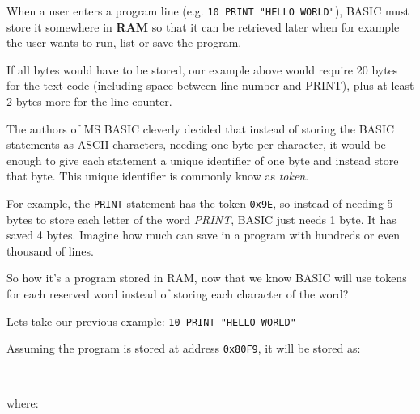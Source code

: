     When a user enters a program line (e.g. \texttt{10 PRINT "HELLO WORLD"}),
    BASIC must store it somewhere in \textbf{RAM} so that it can be retrieved
    later when for example the user wants to run, list or save the program.

    If all bytes would have to be stored, our example above would require 20
    bytes for the text code (including space between line number and PRINT),
    plus at least 2 bytes more for the line counter.

    The authors of MS BASIC cleverly decided that instead of storing the BASIC
    statements as ASCII characters, needing one byte per character, it would be
    enough to give each statement a unique identifier of one byte and instead
    store that byte. This unique identifier is commonly know as \textit{token}.

    For example, the \texttt{PRINT} statement has the token \texttt{0x9E}, so
    instead of needing 5 bytes to store each letter of the word \textit{PRINT},
    BASIC just needs 1 byte. It has saved 4 bytes. Imagine how much can save in
    a program with hundreds or even thousand of lines.

    So how it's a program stored in RAM, now that we know BASIC will use tokens
    for each reserved word instead of storing each character of the word?

    Lets take our previous example: \texttt{10 PRINT "HELLO WORLD"}

    Assuming the program is stored at address \texttt{0x80F9}, it will be stored
    as:

    \texttt{
    }

    where:

